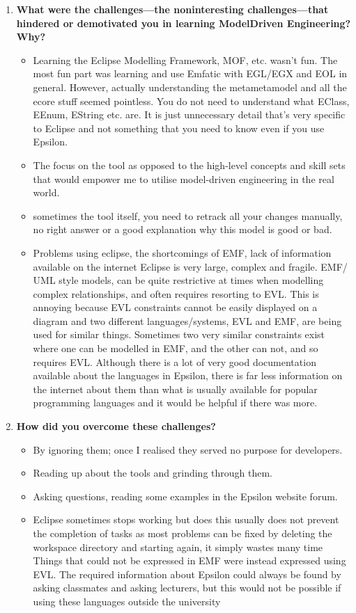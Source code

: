 \documentclass[12pt, a4paper]{report}
\begin{document}
{\begin{appendices}
\begin{enumerate}
\item \textbf{ What were the challenges---the non­interesting challenges---that hindered or demotivated you in learning Model­Driven Engineering? Why?}
\begin{itemize}
\item Learning the Eclipse Modelling Framework, MOF, etc. wasn't fun. The most fun part was learning and use Emfatic with EGL/EGX and EOL in general. However, actually understanding the meta­metamodel and all the ecore stuff seemed pointless. You do not need to understand what EClass, EEnum, EString etc. are. It is just unnecessary detail that's very specific to
Eclipse and not something that you need to know even if you use Epsilon.
\item The focus on the tool as opposed to the high-level concepts and skill sets that would empower me to utilise model-driven engineering in the real world.
\item sometimes the tool itself, you need to re­track all your changes manually, no right answer or a good explanation why this model is good or bad.
\item Problems using eclipse, the shortcomings of EMF, lack of information available on the internet Eclipse is very large, complex and fragile. EMF/ UML ­style models, can be quite restrictive at times when modelling complex relationships, and often requires resorting to EVL. This is annoying because EVL constraints cannot be easily displayed on a diagram and two different languages/systems, EVL and EMF, are being used for similar things. Sometimes two very similar constraints exist where one can be modelled in EMF, and the other can not, and so requires EVL. Although there is a lot of very good documentation available about the languages in Epsilon, there is far less information on the internet about them than what is usually available for popular programming languages and it would be helpful if there was more.
\end{itemize}

\item \textbf{How did you overcome these challenges?}
\begin{itemize}
\item By ignoring them; once I realised they served no purpose for developers.
\item Reading up about the tools and grinding through them.
\item Asking questions, reading some examples in the Epsilon website forum.
\item Eclipse sometimes stops working but does this usually does not prevent the completion of tasks as most problems can be fixed by deleting the workspace directory and starting again, it simply wastes many time Things that could not be expressed in EMF were instead expressed using EVL. The required information about Epsilon could always be found by
asking classmates and asking lecturers, but this would not be possible if using these languages outside the university
\end{itemize}
\end{enumerate}


\end{appendices}}
\end{document}
